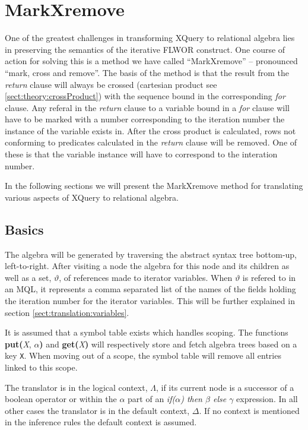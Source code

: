 \section{MarkXremove}
\label{sect:translation:markXremove}

One of the greatest challenges in transforming XQuery to relational algebra
lies in preserving the semantics of the iterative FLWOR construct. One
course of action for solving this is a method we have called ``MarkXremove'' --
pronounced ``mark, cross and remove''. The basis of the method is that the
result from the \textit{return} clause will always be crossed (cartesian product
see \ref{sect:theory:crossProduct}) with the sequence bound in the
corresponding \textit{for} clause. Any referal in the \textit{return} clause to a
variable bound in a \textit{for} clause will have to be marked with a number
corresponding to the iteration number the instance of the variable exists in.
After the cross product is calculated, rows not conforming to predicates
calculated in the \textit{return} clause will be removed. One of these is that
the variable instance will have to correspond to the interation number.

In the following sections we will present the MarkXremove method for
translating various aspects of XQuery to relational algebra.

\subsection{Basics}
The algebra will be generated by traversing the abstract syntax tree bottom-up,
left-to-right. After visiting a node the algebra for this node and its children
as well as a set, $\vartheta$, of references made to iterator variables. When
$\vartheta$ is refered to in an MQL, it represents a comma separated list of
the names of the fields holding the iteration number for the iterator
variables. This will be further explained in section
\ref{sect:translation:variables}.

It is assumed that a symbol table exists which handles scoping. The functions
\textbf{put(}\textit{X}, $\alpha$\textbf{)} and \textbf{get(}\textit{X}\textbf{)}
will respectively store and fetch algebra trees based on a key \verb!X!. When
moving out of a scope, the symbol table will remove all entries linked to this scope.

The translator is in the logical context, $\Lambda$, if its current node is a
successor of a boolean operator or within the $\alpha$ part of an
\textit{if($\alpha$) then $\beta$ else $\gamma$} expression. In all other cases
the translator is in the default context, $\Delta$. If no context is mentioned
in the inference rules the default context is assumed.

